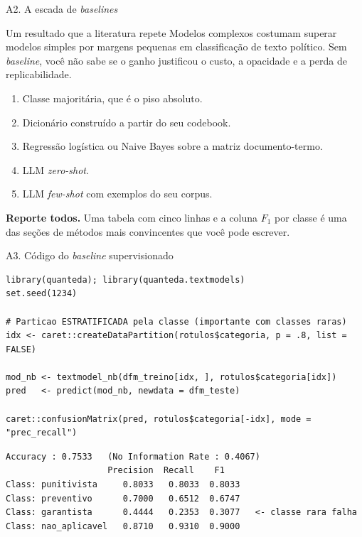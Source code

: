 \documentclass[11pt,aspectratio=169]{beamer}
\begin{document}
\begin{frame}{A2. A escada de \emph{baselines}}
\begin{block}{Um resultado que a literatura repete}
Modelos complexos costumam superar modelos simples por margens pequenas em
classificação de texto político. Sem \emph{baseline}, você não sabe se o ganho
justificou o custo, a opacidade e a perda de replicabilidade.
\end{block}
\vspace{0.25cm}
\begin{enumerate}\small
  \item Classe majoritária, que é o piso absoluto.
  \item Dicionário construído a partir do seu codebook.
  \item Regressão logística ou Naive Bayes sobre a matriz documento-termo.
  \item LLM \emph{zero-shot}.
  \item LLM \emph{few-shot} com exemplos do seu corpus.
\end{enumerate}
\vspace{0.15cm}
\footnotesize \textbf{Reporte todos.} Uma tabela com cinco linhas e a coluna
$F_1$ por classe é uma das seções de métodos mais convincentes que você pode
escrever.
\end{frame}

\begin{frame}[fragile]{A3. Código do \emph{baseline} supervisionado}
\begin{lstlisting}
library(quanteda); library(quanteda.textmodels)
set.seed(1234)

# Particao ESTRATIFICADA pela classe (importante com classes raras)
idx <- caret::createDataPartition(rotulos$categoria, p = .8, list = FALSE)

mod_nb <- textmodel_nb(dfm_treino[idx, ], rotulos$categoria[idx])
pred   <- predict(mod_nb, newdata = dfm_teste)

caret::confusionMatrix(pred, rotulos$categoria[-idx], mode = "prec_recall")
\end{lstlisting}
\begin{lstlisting}[style=Rsaida]
Accuracy : 0.7533   (No Information Rate : 0.4067)
                    Precision  Recall    F1
Class: punitivista     0.8033   0.8033  0.8033
Class: preventivo      0.7000   0.6512  0.6747
Class: garantista      0.4444   0.2353  0.3077   <- classe rara falha
Class: nao_aplicavel   0.8710   0.9310  0.9000
\end{lstlisting}
\end{frame}
\end{document}
